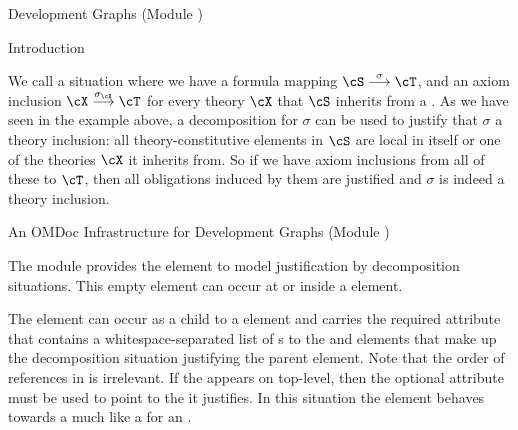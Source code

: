 \begin{omgroup}[id=complex-theories,short=Complex Theories,
                            creators=miko,contributors=frabe]
\begin{omgroup}[id=development-graphs,short=Development Graphs]{Development Graphs (Module
  {})}
\begin{module}[id=dgraph]
\begin{omgroup}[id=dg-intro,short=Introduction]{Introduction}
\begin{omtext}
We call a situation where we have a formula mapping
$\cS\stackrel\sigma\longrightarrow\cT$, and an axiom inclusion
$\cX\stackrel{\sigma_\cX}\longrightarrow\cT$ for every theory $\cX$ that $\cS$ inherits
from a . As we have seen in the example above, a decomposition for $\sigma$ can
be used to justify that $\sigma$ a theory inclusion: all theory-constitutive elements in
$\cS$ are local in itself or one of the theories $\cX$ it inherits from. So if we have
axiom inclusions from all of these to $\cT$, then all obligations induced by them are
justified and $\sigma$ is indeed a theory inclusion.
\end{omtext}
\end{omgroup}

\begin{omgroup}[id=dg-omdoc,short=OMDoc Development Graphs]{An OMDoc Infrastructure for
  Development Graphs (Module {})}
  
\begin{definition}[id=decomposition.def]
  The {} module provides the {} element to model
  justification by decomposition situations.  This empty element can occur at
  {} or inside a  element.
 
  The  element can occur as a child to a
   element and carries the required attribute
   that contains a whitespace-separated list of
  {s} to the {} and 
  elements that make up the decomposition situation justifying the parent
   element. Note that the order of references in
   is irrelevant. If the 
  appears on top-level, then the optional  attribute must
  be used to point to the  it justifies. In this situation the
   element behaves towards a  much
  like a  for an .
\end{definition}


\end{omgroup}
\end{module}
\end{omgroup}
\end{omgroup}
